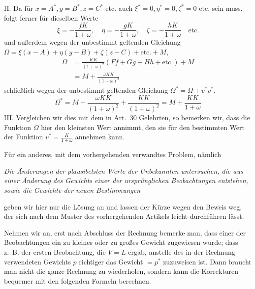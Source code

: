 II. Da für \(x=A^*,\allowbreak y=B^*,\allowbreak z=C^*\) etc. auch \(\xi^*=0,\allowbreak\eta^*=0,\allowbreak\zeta^*=0\) etc. sein muss, folgt ferner für dieselben Werte
\[
\xi=-\frac{fK}{1+\omega},\quad\eta=-\frac{gK}{1+\omega},\quad\zeta=-\frac{hK}{1+\omega}\quad\text{etc.}
\]
und außerdem wegen der unbestimmt geltenden Gleichung
\(\Omega=\xi(x-A)+\eta(y-B)+\zeta(z-C)+\text{etc.}+M\),
\[
\begin{aligned}
\Omega&=\frac{KK}{(1+\omega)^2}(Ff+Gg+Hh+\text{etc.})+M\\
&=M+\frac{\omega KK}{(1+\omega)^2}
\end{aligned}
\]
schließlich wegen der unbestimmt geltenden Gleichung
\(\Omega^*=\Omega+v^*v^*\),
\[
\Omega^*=M+\frac{\omega KK}{(1+\omega)^2}+\frac{KK}{(1+\omega)^2}=M+\frac{KK}{1+\omega}
\]
III. Vergleichen wir dies mit dem in Art.\ 30 Gelehrten, so bemerken wir, dass die Funktion \(\Omega\) hier den kleinsten Wert annimmt, den sie für den bestimmten Wert der Funktion \(v^*=\frac{K}{1+\omega}\) annehmen kann.

Für ein anderes, mit dem vorhergehenden verwandtes Problem, nämlich

\textit{Die Änderungen der plausibelsten Werte der Unbekannten untersuchen, die aus einer Änderung des Gewichts einer der ursprünglichen Beobachtungen entstehen, sowie die Gewichte der neuen Bestimmungen}

\noindent geben wir hier nur die Lösung an und lassen der Kürze wegen den Beweis weg, der sich nach dem Muster des vorhergehenden Artikels leicht durchführen lässt.

Nehmen wir an, erst nach Abschluss der Rechnung bemerke man, dass einer der Beobachtungen ein zu kleines oder zu großes Gewicht zugewiesen wurde; dass z.\ B. der ersten Beobachtung, die \(V=L\) ergab, anstelle des in der Rechnung verwendeten Gewichts \(p\) richtiger das Gewicht \(=p^*\) zuzuweisen ist. Dann braucht man nicht die ganze Rechnung zu wiederholen, sondern kann die Korrekturen bequemer mit den folgenden Formeln berechnen.

